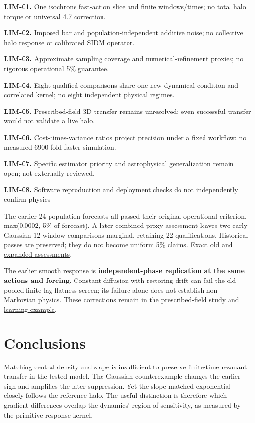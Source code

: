 \documentclass[fleqn,usenatbib]{mnras}
\begin{document}
\textbf{LIM-01.} One isochrone fast-action slice and finite windows/times; no total halo torque or universal 4.7 correction.

\textbf{LIM-02.} Imposed bar and population-independent additive noise; no collective halo response or calibrated SIDM operator.

\textbf{LIM-03.} Approximate sampling coverage and numerical-refinement proxies; no rigorous operational 5\% guarantee.

\textbf{LIM-04.} Eight qualified comparisons share one new dynamical condition and correlated kernel; no eight independent physical regimes.

\textbf{LIM-05.} Prescribed-field 3D transfer remains unresolved; even successful transfer would not validate a live halo.

\textbf{LIM-06.} Cost-times-variance ratios project precision under a fixed workflow; no measured 6900-fold faster simulation.

\textbf{LIM-07.} Specific estimator priority and astrophysical generalization remain open; not externally reviewed.

\textbf{LIM-08.} Software reproduction and deployment checks do not independently confirm physics.

The earlier 24 population forecasts all passed their original operational criterion, max(0.0002, 5\% of forecast). A later combined-proxy assessment leaves two early Gaussian-12 window comparisons marginal, retaining 22 qualifications. Historical passes are preserved; they do not become uniform 5\% claims. \href{https://djova.ca/galaxy-bar/diagnostics/population-accuracy/joint-error-assessment.json}{Exact old and expanded assessments}.

The earlier smooth response is \textbf{independent-phase replication at the same actions and forcing}. Constant diffusion with restoring drift can fail the old pooled finite-lag flatness screen; its failure alone does not establish non-Markovian physics. These corrections remain in the \href{https://djova.ca/galaxy-bar/response.html}{prescribed-field study} and \href{https://djova.ca/galaxy-bar/learn.html\#learn-5}{learning example}.

\section{Conclusions}\label{conclusions}

Matching central density and slope is insufficient to preserve finite-time resonant transfer in the tested model. The Gaussian counterexample changes the earlier sign and amplifies the later suppression. Yet the slope-matched exponential closely follows the reference halo. The useful distinction is therefore which gradient differences overlap the dynamics' region of sensitivity, as measured by the primitive response kernel.
\end{document}
